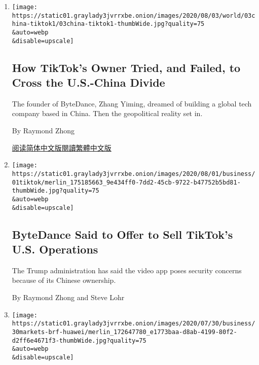 \begin{enumerate}
\def\labelenumi{\arabic{enumi}.}
\item
  \href{/2020/08/03/technology/tiktok-bytedance-us-china.html}{}

  \texttt{[image: https://static01.graylady3jvrrxbe.onion/images/2020/08/03/world/03china-tiktok1/03china-tiktok1-thumbWide.jpg?quality=75\\\&auto=webp\\\&disable=upscale]}

  \hypertarget{how-tiktoks-owner-tried-and-failed-to-cross-the-us-china-divide}{%
  \subsection{How TikTok's Owner Tried, and Failed, to Cross the
  U.S.-China
  Divide}\label{how-tiktoks-owner-tried-and-failed-to-cross-the-us-china-divide}}

  The founder of ByteDance, Zhang Yiming, dreamed of building a global
  tech company based in China. Then the geopolitical reality set in.

  By Raymond Zhong

  \href{https://cn.nytimes3xbfgragh.onion/technology/20200804/tiktok-trump-sale-microsoft/}{阅读简体中文版}\href{https://cn.nytimes3xbfgragh.onion/technology/20200804/tiktok-trump-sale-microsoft/zh-hant/}{閱讀繁體中文版}
\item
  \href{/2020/08/01/technology/tiktok-sale-trump-ban.html}{}

  \texttt{[image: https://static01.graylady3jvrrxbe.onion/images/2020/08/01/business/01tiktok/merlin\_175185663\_9e434ff0-7dd2-45cb-9722-b47752b5bd81-thumbWide.jpg?quality=75\\\&auto=webp\\\&disable=upscale]}

  \hypertarget{bytedance-said-to-offer-to-sell-tiktoks-us-operations}{%
  \subsection{ByteDance Said to Offer to Sell TikTok's U.S.
  Operations}\label{bytedance-said-to-offer-to-sell-tiktoks-us-operations}}

  The Trump administration has said the video app poses security
  concerns because of its Chinese ownership.

  By Raymond Zhong and Steve Lohr
\item
  \href{/2020/07/30/business/huaweis-phones-outsell-samsungs-a-milestone-report-says.html}{}

  \texttt{[image: https://static01.graylady3jvrrxbe.onion/images/2020/07/30/business/30markets-brf-huawei/merlin\_172647780\_e1773baa-d8ab-4199-80f2-d2ff6e4671f3-thumbWide.jpg?quality=75\\\&auto=webp\\\&disable=upscale]}


\end{enumerate}
